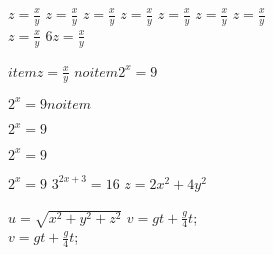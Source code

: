 		\begin{tabenum}[\bfseries1)]%
		\tabenumitem 		$z=\displaystyle\frac xy$
		\tabenumitem 		$z=\displaystyle\frac xy$
		\tabenumitem 		$z=\displaystyle\frac xy$
		\tabenumitem 		$z=\displaystyle\frac xy$
		\tabenumitem 		$z=\displaystyle\frac xy$
		\tabenumitem 		$z=\displaystyle\frac xy$
		\tabenumitem 		$z=\displaystyle\frac xy$\\
		\tabenumitem 		$z=\displaystyle\frac xy$ 
		\skipitem
		\tabenumitem 		$6 z=\displaystyle\frac xy$\\	
		\item			$ item  z=\displaystyle\frac xy$
		\noitem			$ noitem 2^x=9$
		\item			$2^x=9 noitem$\cr
		\item			$2^x=9$\cr
		\item			$2^x=9$\cr
		\item			$2^x=9$\cr
		\tabenumitem		$3^{2x+3}=16 $
		\tabenumitem		$z=2x^2+4y^2$\par
		\tabenumitem		$u=\sqrt{x^2+y^2+z^2}$
		\tabenumitem		$v=gt+\displaystyle\frac{g}{4}t$;\\[1ex]
		\tabenumitem		$v=gt+\frac{g}{4}t$;\\[1ex]
		\end{tabenum}







